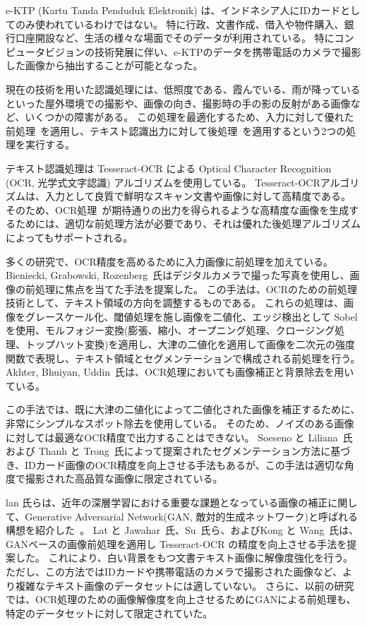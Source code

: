 \documentclass[uplatex, twocolumn,10pt]{jsarticle}
\begin{document}
e-KTP (Kartu Tanda Penduduk Elektronik) は、インドネシア人にIDカードとしてのみ使われているわけではない。
特に行政、文書作成、借入や物件購入、銀行口座開設など、生活の様々な場面でそのデータが利用されている。
特にコンピュータビジョンの技術発展に伴い、e-KTPのデータを携帯電話のカメラで撮影した画像から抽出することが可能となった。

現在の技術を用いた認識処理には、低照度である、霞んでいる、雨が降っているといった屋外環境での撮影や、画像の向き、撮影時の手の影の反射がある画像など、いくつかの障害がある。
この処理を最適化するため、入力に対して優れた前処理~\cite{bib1}を適用し、テキスト認識出力に対して後処理~\cite{bib2}を適用するという2つの処理を実行する。

テキスト認識処理は Tesseract-OCR による Optical Character Recognition (OCR, 光学式文字認識) アルゴリズムを使用している。
Tesseract-OCRアルゴリズムは、入力として良質で鮮明なスキャン文書や画像に対して高精度である。
そのため、OCR処理~\cite{bib1}が期待通りの出力を得られるような高精度な画像を生成するためには、適切な前処理方法が必要であり、それは優れた後処理アルゴリズムによってもサポートされる。

多くの研究で、OCR精度を高めるために入力画像に前処理を加えている。
Bieniecki, Grabowski, Rozenberg~\cite{bib1}氏はデジタルカメラで撮った写真を使用し、画像の前処理に焦点を当てた手法を提案した。
この手法は、OCRのための前処理技術として、テキスト領域の方向を調整するものである。
これらの処理は、画像をグレースケール化、閾値処理を施し画像を二値化、エッジ検出として Sobel を使用、モルフォジー変換(膨張、縮小、オープニング処理、クロージング処理、トップハット変換)を適用し、大津の二値化を適用して画像を二次元の強度関数で表現し、テキスト領域とセグメンテーションで構成される前処理を行う。
Akhter, Bhuiyan, Uddin~\cite{bib5}氏は、OCR処理においても画像補正と背景除去を用いている。

この手法では、既に大津の二値化によって二値化された画像を補正するために、非常にシンプルなスポット除去を使用している。
そのため、ノイズのある画像に対しては最適なOCR精度で出力することはできない。
Soeseno と Liliana~\cite{bib6}氏 および Thanh と Trong~\cite{bib7}氏によって提案されたセグメンテーション方法に基づき、IDカード画像のOCR精度を向上させる手法もあるが、この手法は適切な角度で撮影された高品質な画像に限定されている。

lan 氏らは、近年の深層学習における重要な課題となっている画像の補正に関して、Generative Adversarial Network(GAN, 敵対的生成ネットワーク)と呼ばれる構想を紹介した~\cite{bib8}。
Lat と Jawahar~\cite{bib9}氏、Su~\cite{bib10}氏ら、およびKong と Wang~\cite{bib11}氏は、GANベースの画像前処理を適用し Tesseract-OCR の精度を向上させる手法を提案した。
これにより、白い背景をもつ文書テキスト画像に解像度強化を行う。
ただし、この方法ではIDカードや携帯電話のカメラで撮影された画像など、より複雑なテキスト画像のデータセットには適していない。
さらに、以前の研究では、OCR処理のための画像解像度を向上させるためにGANによる前処理も、特定のデータセットに対して限定されていた。
\end{document}
